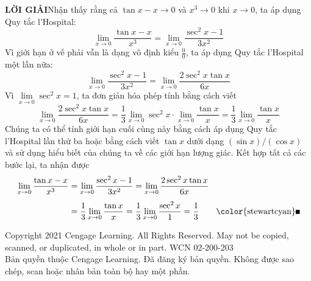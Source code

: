\begin{minipage}[t]{0.70\textwidth}
    \vspace{0.4em}
    \noindent
    \textbf{\textsf{\color{stewartcyan}LỜI GIẢI}}\quad Nhận thấy rằng cả $\tan x - x \to 0$ và $x^3 \to 0$ khi $x \to 0$, ta áp dụng Quy tắc l'Hospital:
    \[
    \lim_{x \to 0} \frac{\tan x - x}{x^3} = \lim_{x \to 0} \frac{\sec^2 x - 1}{3x^2}
    \]
    Vì giới hạn ở vế phải vẫn là dạng vô định kiểu $\frac{0}{0}$, ta áp dụng Quy tắc l'Hospital một lần nữa:
    \[
    \lim_{x \to 0} \frac{\sec^2 x - 1}{3x^2} = \lim_{x \to 0} \frac{2\sec^2 x \tan x}{6x}
    \]
    Vì $\lim\limits_{x \to 0} \sec^2 x = 1$, ta đơn giản hóa phép tính bằng cách viết
    \[
    \lim_{x \to 0} \frac{2\sec^2 x \tan x}{6x} = \frac{1}{3}\lim_{x \to 0} \sec^2 x \cdot \lim_{x \to 0} \frac{\tan x}{x} = \frac{1}{3}\lim_{x \to 0} \frac{\tan x}{x}
    \]
    Chúng ta có thể tính giới hạn cuối cùng này bằng cách áp dụng Quy tắc l'Hospital lần thứ ba hoặc bằng cách viết $\tan x$ dưới dạng $(\sin x)/(\cos x)$ và sử dụng hiểu biết của chúng ta về các giới hạn lượng giác. Kết hợp tất cả các bước lại, ta nhận được
    \begin{align*}
    \lim_{x \to 0} \frac{\tan x - x}{x^3} &= \lim_{x \to 0} \frac{\sec^2 x - 1}{3x^2} = \lim_{x \to 0} \frac{2\sec^2 x \tan x}{6x} \\[4pt]
    &= \frac{1}{3}\lim_{x \to 0} \frac{\tan x}{x} = \frac{1}{3}\lim_{x \to 0} \frac{\sec^2 x}{1} = \frac{1}{3} \tag*{\color{stewartcyan}\rule{1.1ex}{1.1ex}}
    \end{align*}
\end{minipage}

\vfill
\noindent
\begin{minipage}{\textwidth}
    \tiny\color{stewartgray}
    Copyright 2021 Cengage Learning. All Rights Reserved. May not be copied, scanned, or duplicated, in whole or in part. WCN 02-200-203\\ 
    Bản quyền thuộc Cengage Learning. Đã đăng ký bản quyền. Không được sao chép, scan hoặc nhân bản toàn bộ hay một phần.
\end{minipage}
